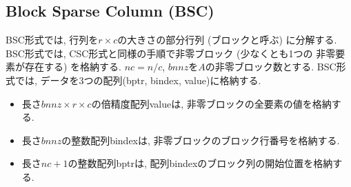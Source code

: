 \documentclass[a4paper]{jarticle}
\begin{document}
{{\subsection{Block Sparse Column (BSC)}
BSC形式では, 行列を$r \times c$の大きさの部分行列 (ブロックと呼ぶ) に分解する. 
BSC形式では, CSC形式と同様の手順で非零ブロック (少なくとも1つの
非零要素が存在する) を格納する. 
$nc=n/c$, $bnnz$を$A$の非零ブロック数とする. 
BSC形式では, データを3つの配列({\ttfamily bptr, bindex, value})に格納する. 
\begin{itemize}
\item 長さ$bnnz \times r \times c$の倍精度配列{\ttfamily value}は, 非零ブロックの全要素の値を格納する. 
\item 長さ$bnnz$の整数配列{\ttfamily bindex}は, 非零ブロックのブロック行番号を格納する. 
\item 長さ$nc+1$の整数配列{\ttfamily bptr}は, 配列{\ttfamily bindex}のブロック列の開始位置を格納する. 
\end{itemize}

}}
\end{document}
